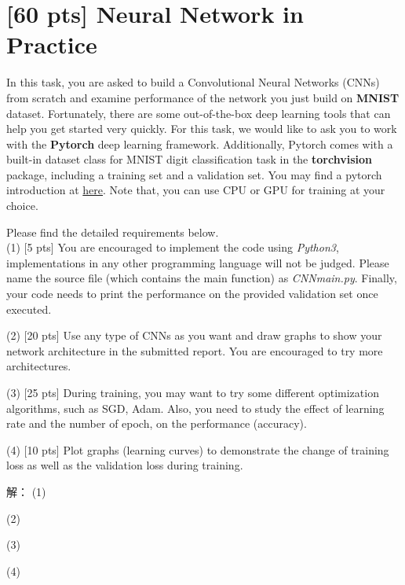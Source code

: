 \documentclass{article}
\begin{document}
	\newpage
	\section{[60 pts] Neural Network in Practice}
	
	\noindent In this task, you are asked to build a Convolutional Neural Networks (CNNs) from scratch and examine performance of the network you just build on \textbf{MNIST} dataset.
	Fortunately, there are some out-of-the-box deep learning tools that can help you get started very quickly. For this task, we would like to ask you to work with the \textbf{Pytorch} deep learning framework. Additionally, Pytorch comes with a built-in dataset class for MNIST digit classification task in the \textbf{torchvision} package, including a training set and a validation set. You may find a pytorch introduction at \href{https://pytorch.org/tutorials/beginner/blitz/cifar10_tutorial.html}{here}. Note that, you can use CPU or GPU for training at your choice.
	
	Please find the detailed requirements below.\\

	(1) [5 pts] You are encouraged to implement the code using \emph{Python3}, implementations in any other programming language will not be judged. Please name the source file (which contains the main function) as \emph{CNN\underline{\hspace{0.5em}}main.py}. Finally, your code needs to print the performance on the provided validation set once executed.
		    
	(2) [20 pts] Use any type of CNNs as you want and draw graphs to show your network architecture in the submitted report. You are encouraged to try more architectures.
		    
	(3) [25 pts] During training, you may want to try some different optimization algorithms, such as SGD, Adam. Also, you need to study the effect of learning rate and the number of epoch, on the performance (accuracy).
		    
	(4) [10 pts] Plot graphs (learning curves) to demonstrate the change of training loss as well as the validation loss during training.

	\noindent 解：
	(1)

	\noindent (2)

	\noindent (3)

	\noindent (4)
\end{document}

